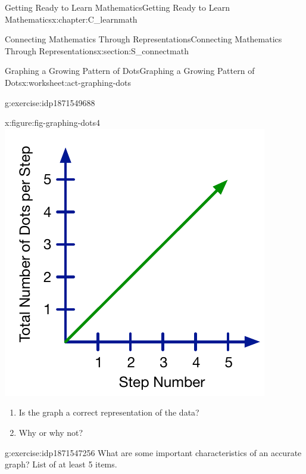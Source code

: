\documentclass[oneside,10pt,]{book}
\numberwithin{equation}{chapter}
\begin{document}
\begin{chapterptx}{Getting Ready to Learn Mathematics}{}{Getting Ready to Learn Mathematics}{}{}{x:chapter:C_learnmath}
\begin{sectionptx}{Connecting Mathematics Through Representations}{}{Connecting Mathematics Through Representations}{}{}{x:section:S_connectmath}
\begin{worksheet-subsection}{Graphing a Growing Pattern of Dots}{}{Graphing a Growing Pattern of Dots}{}{}{x:worksheet:act-graphing-dots}
\begin{divisionexercise}{1}{}{}{g:exercise:idp1871549688}
\begin{sidebyside}{4}{0}{0}{0}
\begin{sbspanel}{0.25}
\begin{figureptx}{}{x:figure:fig-graphing-dots4}{}
\includegraphics[width=\linewidth]{external/graphing-dots4.pdf}
\tcblower
\end{figureptx}%
\end{sbspanel}%
\end{sidebyside}%
%
\begin{enumerate}[font=\bfseries,label=(\alph*),ref=\alph*]
\item{}Is the graph a correct representation of the data?%
\item{}Why or why not?%
\end{enumerate}
\end{divisionexercise}%
\begin{divisionexercise}{2}{}{}{g:exercise:idp1871547256}%
What are some important characteristics of an accurate graph? List of at least 5 items.%
\end{divisionexercise}%
\begin{conclusion}{}%

\end{conclusion}
\end{worksheet-subsection}
\end{sectionptx}
\end{chapterptx}
\end{document}
